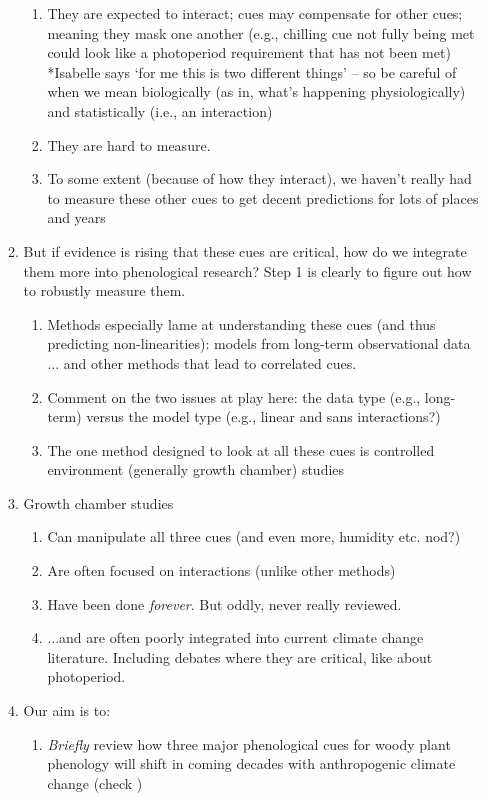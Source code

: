 \documentclass[11pt,letterpaper]{article}
\begin{document}
\begin{enumerate}
\begin{enumerate}
\begin{enumerate}
\item They are expected to interact; cues may compensate for other cues; meaning they mask one another (e.g., chilling cue not fully being met could look like a photoperiod requirement that has not been met) *Isabelle says `for me this is two different things' -- so be careful of when we mean biologically (as in, what's happening physiologically) and statistically (i.e., an interaction)
\item They are hard to measure.
\item To some extent (because of how they interact), we haven't really had to measure these other cues to get decent predictions for lots of places and years
\end{enumerate}
\item But if evidence is rising that these cues are critical, how do we integrate them more into phenological research? Step 1 is clearly to figure out how to robustly measure them. 
\begin{enumerate}
\item Methods especially lame at understanding these cues (and thus predicting non-linearities): models from long-term observational data ... and other methods that lead to correlated cues. 
\item Comment on the two issues at play here: the data type (e.g., long-term) versus the model type (e.g., linear and sans interactions?)
\item The one method designed to look at all these cues is controlled environment (generally growth chamber) studies \citep{nagano2012,satake2013} %
\end{enumerate}
\item Growth chamber studies
\begin{enumerate}
\item Can manipulate all three cues (and even more, humidity etc. nod?)
\item Are often focused on interactions (unlike other methods)
\item Have been done \emph{forever}. But oddly, never really reviewed.
\item  ...and are often poorly integrated into current climate change literature. Including debates where they are critical, like about photoperiod. 
\end{enumerate}
\item Our aim is to:
\begin{enumerate}
\item \emph{Briefly} review how three major phenological cues for woody plant phenology will shift in coming decades with anthropogenic climate change (check \citet{primack2015})

\end{enumerate}
\end{enumerate}
\end{enumerate}
\end{document}
